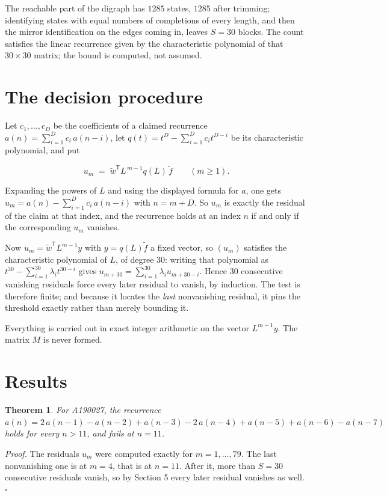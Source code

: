 \documentclass[11pt]{article}
\newtheorem{theorem}{Theorem}
\theoremstyle{definition}
\begin{document}
The reachable part of the digraph has $1285$ states, $1285$ after trimming; identifying states with equal numbers of completions of every length, and then the mirror identification on the edges coming in, leaves $S = 30$ blocks. The count satisfies the linear recurrence given by the characteristic polynomial of that $30\times30$ matrix; the bound is computed, not assumed.

\section{The decision procedure}

Let $c_1,\dots,c_D$ be the coefficients of a claimed recurrence $a(n) = \sum_{i=1}^{D} c_i\,a(n-i)$, let $q(t) = t^{D} - \sum_{i=1}^{D} c_i t^{D-i}$ be its characteristic polynomial, and put

\[u_m \;=\; \tilde w^{\mathsf T} L^{\,m-1} q(L)\,\tilde f \qquad (m \ge 1).\]

Expanding the powers of $L$ and using the displayed formula for $a$, one gets $u_m = a(n) - \sum_{i=1}^{D} c_i\,a(n-i)$ with $n = m + D$. So $u_m$ is exactly the residual of the claim at that index, and the recurrence holds at an index $n$ if and only if the corresponding $u_m$ vanishes.

Now $u_m = \tilde w^{\mathsf T} L^{m-1} y$ with $y = q(L)\tilde f$ a fixed vector, so $(u_m)$ satisfies the characteristic polynomial of $L$, of degree $30$: writing that polynomial as $t^{30} - \sum_{i=1}^{30} \lambda_i t^{30-i}$ gives $u_{m+30} = \sum_{i=1}^{30} \lambda_i u_{m+30-i}$. Hence $30$ consecutive vanishing residuals force every later residual to vanish, by induction. The test is therefore finite; and because it locates the {\itshape last} nonvanishing residual, it pins the threshold exactly rather than merely bounding it.

Everything is carried out in exact integer arithmetic on the vector $L^{m-1}y$. The matrix $M$ is never formed.

\section{Results}

\begin{theorem} For A190027, the recurrence $a(n) = 2\,a(n-1) - a(n-2) + a(n-3) - 2\,a(n-4) + a(n-5) + a(n-6) - a(n-7)$ holds for every $n > 11$, and fails at $n = 11$.\end{theorem}

{\itshape Proof.} The residuals $u_m$ were computed exactly for $m = 1,\dots,79$. The last nonvanishing one is at $m = 4$, that is at $n = 11$. After it, more than $S = 30$ consecutive residuals vanish, so by Section 5 every later residual vanishes as well. $\square$
\end{document}
